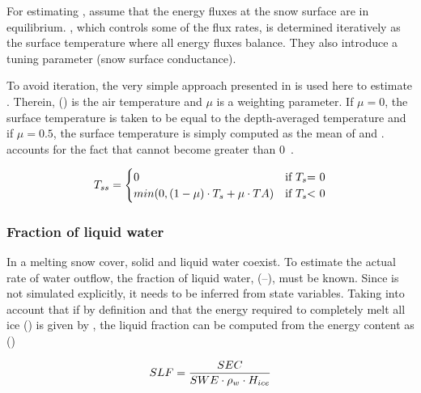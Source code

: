 For estimating \snowSurfaceTemperature{}, \citet{Tarboton1996} assume that the energy fluxes at the snow surface are in equilibrium. \snowSurfaceTemperature{}, which controls some of the flux rates, is determined iteratively as the surface temperature where all energy fluxes balance. They also introduce a tuning parameter (snow surface conductance).

To avoid iteration, the very simple approach presented in  is used here to estimate \snowSurfaceTemperature{}. Therein, \airtemp{} (\celsius) is the air temperature and $\mu$ is a weighting parameter. If $\mu=0$, the surface temperature \snowSurfaceTemperature{} is taken to be equal to the depth-averaged temperature \snowTemperature{} and if $\mu=0.5$, the surface temperature is simply computed as the mean of \snowTemperature{} and \airtemp.  accounts for the fact that \snowSurfaceTemperature{} cannot become greater than 0~\celsius.

\begin{equation} \label{eqn:snow-enBal_surfaceTemperature}
  T_{ss}=
  \begin{cases}
     0 & \text{if \ensuremath{T_s}= 0} \\
     min(0, (1-\mu) \cdot T_s + \mu \cdot TA) & \text{if \ensuremath{T_s}< 0} \\
  \end{cases}
\end{equation}

\subsubsection{Fraction of liquid water} \label{sec:snow-enBal_fractionLiquid}
In a melting snow cover, solid and liquid water coexist. To estimate the actual rate of water outflow, the fraction of liquid water, \snowFractionLiquid{} (--), must be known. Since \snowFractionLiquid{} is not simulated explicitly, it needs to be inferred from state variables. Taking into account that  if  by definition and that the energy required to completely melt all ice () is given by , the liquid fraction can be computed from the energy content \snowEnergyContent{} as ()

\begin{equation} \label{eqn:snow-enBal_energy-fraction-liquid}
  SLF = \frac{SEC}{SWE \cdot \rho_{w} \cdot H_{ice}}
\end{equation}


